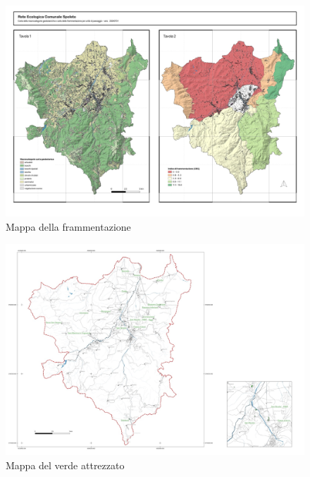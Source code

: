 \documentclass[
  a4paper,
]{book}
\begin{document}
\begin{figure}

{\centering \includegraphics[width=\linewidth]{./figs/agendaUrbana/cartaFrammentazione} 

}

\caption{Mappa della frammentazione}\label{fig:agUframm}
\end{figure}

\begin{figure}

{\centering \includegraphics[width=\linewidth]{./figs/agendaUrbana/mappaVerdiAttrezzati20240619} 

}

\caption{Mappa del verde attrezzato}\label{fig:agUverdi}
\end{figure}
\end{document}
